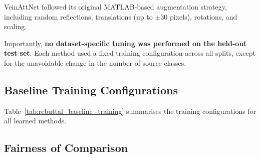 \documentclass[10pt,journal,compsoc]{IEEEtran}
\begin{document}
VeinAttNet followed its original MATLAB-based augmentation strategy, including random reflections, translations (up to $\pm 30$ pixels), rotations, and scaling.

Importantly, \textbf{no dataset-specific tuning was performed on the held-out test set}. Each method used a fixed training configuration across all splits, except for the unavoidable change in the number of source classes.

\subsection{Baseline Training Configurations}

Table~\ref{tab:rebuttal_baseline_training} summarises the training configurations for all learned methods.

\begin{table}[ht!]
    \centering
    \scriptsize
    \caption{Training configurations for the proposed method and all learned baselines.}
    \label{tab:rebuttal_baseline_training}
\end{table}

\subsection{Fairness of Comparison}
\end{document}
